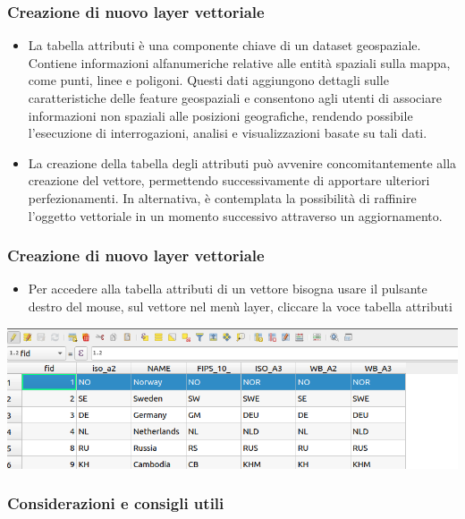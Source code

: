 \documentclass{beamer}
\begin{document}
{\begin{frame}
\begin{columns}
	\end{columns}	
	   
\end{frame}

\begin{frame}
\frametitle{Creazione di nuovo layer vettoriale}
 \begin{itemize}
    		\item La tabella attributi è una componente chiave di un dataset geospaziale. Contiene informazioni alfanumeriche relative alle entità spaziali sulla mappa, come punti, linee e poligoni. Questi dati aggiungono dettagli sulle caratteristiche delle feature geospaziali e consentono agli utenti di associare informazioni non spaziali alle posizioni geografiche, rendendo possibile l'esecuzione di interrogazioni, analisi e visualizzazioni basate su tali dati.
    		
    		\item La creazione della tabella degli attributi può avvenire concomitantemente alla creazione del vettore, permettendo successivamente di apportare ulteriori perfezionamenti. In alternativa, è contemplata la possibilità di raffinire l'oggetto vettoriale in un momento successivo attraverso un aggiornamento.
    	\end{itemize}		
\end{frame} 

\begin{frame}
\frametitle{Creazione di nuovo layer vettoriale}
\begin{itemize}
\item Per accedere alla tabella attributi di un vettore bisogna usare il pulsante destro del mouse, sul vettore nel menù layer, cliccare la voce  tabella attributi
\end{itemize}
\begin{center}
		\includegraphics[width=1\textwidth] {corso2023/tab1.png}
	\end{center}
\end{frame} 


\begin{frame}
   \frametitle{Considerazioni e consigli utili}


\end{frame}}
\end{document}
